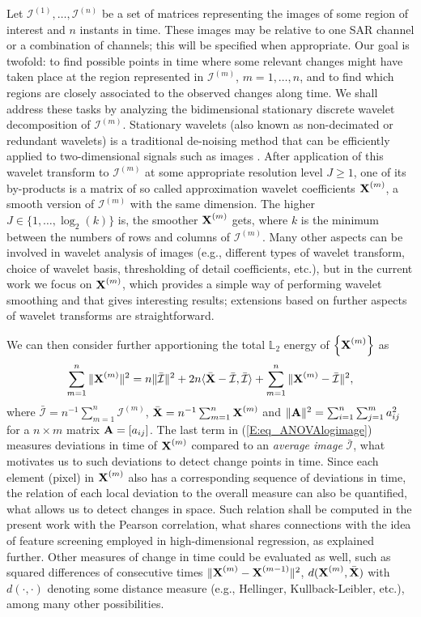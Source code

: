 \documentclass[journal]{IEEEtran}
\newcommand{\vA}{{\textbf A}}
\newcommand{\vX}{{\textbf X}}
\begin{document}
Let $\mathcal{I}^{(1)},\ldots,\mathcal{I}^{(n)}$ be a set of matrices representing the images of some region of interest and $n$ instants in time. These images may be relative to one SAR channel or a combination of channels; this will be specified when appropriate. Our goal is twofold: to find possible points in time where some relevant changes might have taken place at the region represented in $\mathcal{I}^{(m)}$, $m=1,\ldots,n$, and to find which regions are closely associated to the observed changes along time. We shall address these tasks by analyzing the bidimensional stationary discrete wavelet decomposition of $\mathcal{I}^{(m)}$. Stationary wavelets (also known as non-decimated or redundant wavelets) is a traditional de-noising method that can be efficiently applied to two-dimensional signals such as images \cite{coifman1995translation,atto2012multidate,atto2016wavelet}. After application of this wavelet transform to $\mathcal{I}^{(m)}$ at some appropriate resolution level $J\geq 1$, one of its by-products is a matrix of so called approximation wavelet coefficients $\vX^{(m)}$, a smooth version of $\mathcal{I}^{(m)}$ with the same dimension. The higher $J\in\{1,\ldots,\log_2(k)\}$ is, the smoother $\vX^{(m)}$ gets, where $k$ is the minimum between the numbers of rows and columns of $\mathcal{I}^{(m)}$. Many other aspects can be involved in wavelet analysis of images (e.g., different types of wavelet transform, choice of wavelet basis, thresholding of detail coefficients, etc.), but in the current work we focus on $\vX^{(m)}$, which provides a simple way of performing wavelet smoothing and that gives interesting results; extensions based on further aspects of wavelet transforms are straightforward.

We can then consider further apportioning the total $\mathbb{L}_2$ energy of $\left\{\vX^{(m)}\right\}$ as
\begin{equation} 
\sum_{m=1}^n\|\vX^{(m)}\|^2 = n\|\bar{\mathcal{I}}\|^2+2n\langle\bar{\vX}-\bar{\mathcal{I}},\bar{\mathcal{I}}\rangle+\sum_{m=1}^n\|\mathcal \vX^{(m)}-\bar{\mathcal{I}}\|^2,\label{E:eq_ANOVAlogimage}
\end{equation}
where $\bar{\mathcal{I}}=n^{-1}\sum_{m=1}^n\mathcal{I}^{(m)}$, $\bar{\vX}=n^{-1}\sum_{m=1}^n\vX^{(m)}$ and $\|\vA\|^2=\sum_{i=1}^n\sum_{j=1}^m a_{ij}^2$ for a $n\times m$ matrix $\vA=[a_{ij}]$. The last term in (\ref{E:eq_ANOVAlogimage}) measures deviations in time of $\vX^{(m)}$ compared to an {\it average image} $\bar{\mathcal{I}}$, what motivates us to such deviations to detect change points in time. Since each element (pixel) in $\vX^{(m)}$ also has a corresponding sequence of deviations in time, the relation of each local deviation to the overall measure can also be quantified, what allows us to detect changes in space. Such relation shall be computed in the present work with the Pearson correlation, what shares connections with the idea of feature screening employed in high-dimensional regression, as explained further. Other measures of change in time could be evaluated as well, such as squared differences of consecutive times $\|\mathcal \vX^{(m)}-\vX^{(m-1)}\|^2$, $d(\vX^{(m)},\bar{\vX})$ with $d(\cdot,\cdot)$ denoting some distance measure (e.g., Hellinger, Kullback-Leibler, etc.), among many other possibilities.
\end{document}
